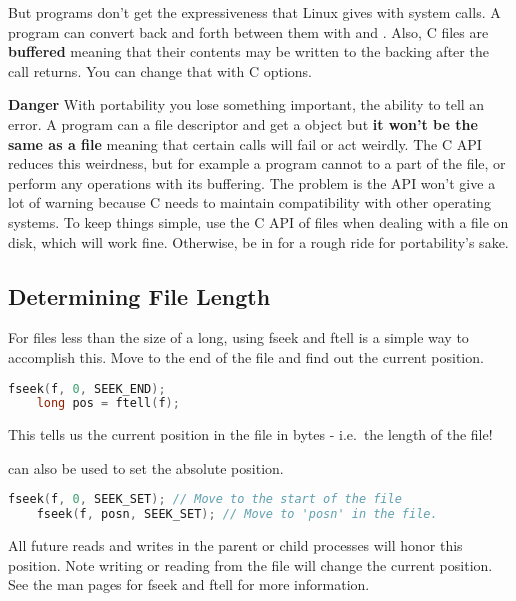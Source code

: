 	But programs don't get the expressiveness that Linux gives with system calls.
	A program can convert back and forth between them with  and .
	Also, C files are \textbf{buffered} meaning that their contents may be written to the backing after the call returns.
	You can change that with C options.
	 
	\textbf{Danger} With portability you lose something important, the ability to tell an error.
	A program can  a file descriptor and get a  object but \textbf{it won't be the same as a file} meaning that certain calls will fail or act weirdly.
	The C API reduces this weirdness, but for example a program cannot  to a part of the file, or perform any operations with its buffering.
	The problem is the API won't give a lot of warning because C needs to maintain compatibility with other operating systems.
	To keep things simple, use the C API of files when dealing with a file on disk, which will work fine. Otherwise, be in for a rough ride for portability's sake.
	 
	\subsection{Determining File Length}
	 
	For files less than the size of a long, using fseek and ftell is a
	simple way to accomplish this.
	Move to the end of the file and find out the current position.
	 
	\begin{lstlisting}[language=C]
	fseek(f, 0, SEEK_END);
	long pos = ftell(f);
	\end{lstlisting}
	 
	This tells us the current position in the file in bytes - i.e.~the
	length of the file!
	 
	 can also be used to set the absolute position.
	 
	\begin{lstlisting}[language=C]
	fseek(f, 0, SEEK_SET); // Move to the start of the file
	fseek(f, posn, SEEK_SET); // Move to 'posn' in the file.
	\end{lstlisting}
	 
	All future reads and writes in the parent or child processes will honor this position.
	Note writing or reading from the file will change the current position.
	See the man pages for fseek and ftell for more information.
	 
